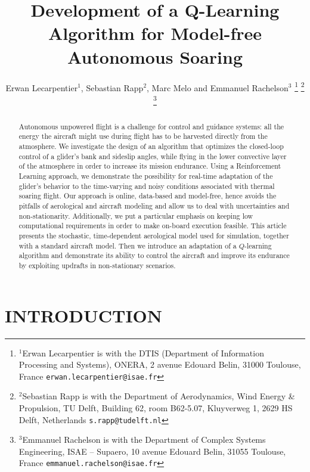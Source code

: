 \documentclass[a4paper, 10pt, conference]{ieeeconf}
\title{\LARGE \bf
	Development of a Q-Learning Algorithm for Model-free Autonomous Soaring
}
\author{Erwan Lecarpentier$^{1}$, Sebastian Rapp$^{2}$, Marc Melo and Emmanuel Rachelson$^{3}$
	\thanks{$^{1}$Erwan Lecarpentier is with the DTIS (Department of Information Processing and Systems), ONERA, 2 avenue Edouard Belin, 31000 Toulouse, France
	{\tt\small erwan.lecarpentier@isae.fr}}
	\thanks{$^{2}$Sebastian  Rapp is with the Department of Aerodynamics, Wind Energy \& Propulsion, TU Delft, Building 62, room B62-5.07, Kluyverweg 1, 2629 HS Delft, Netherlands
	{\tt\small s.rapp@tudelft.nl}}
	\thanks{$^{3}$Emmanuel Rachelson is with the Department of Complex Systems Engineering, ISAE -- Supaero, 10 avenue Edouard Belin, 31055 Toulouse, France
	{\tt\small emmanuel.rachelson@isae.fr}}
}
\begin{document}
\maketitle
\thispagestyle{empty}
\pagestyle{empty}

\begin{abstract}
Autonomous unpowered flight is a challenge for control and guidance systems: all the energy the aircraft might use during flight has to be harvested directly from the atmosphere.
We investigate the design of an algorithm that optimizes the closed-loop control of a glider's bank and sideslip angles, while flying in the lower convective layer of the atmosphere in order to increase its mission endurance.
Using a Reinforcement Learning approach, we demonstrate the possibility for real-time adaptation of the glider's behavior to the time-varying and noisy conditions associated with thermal soaring flight.
{\color{red} Our approach is online, data-based and model-free, hence avoids the pitfalls of aerological and aircraft modeling and allow us to deal with uncertainties and non-stationarity.}
Additionally, we put a particular emphasis on keeping low computational requirements in order to make on-board execution feasible.
This article presents the stochastic, time-dependent aerological model used for simulation, together with a standard aircraft model. Then we introduce an adaptation of a $Q$-learning algorithm and demonstrate its ability to control the aircraft and improve its endurance by exploiting updrafts in non-stationary scenarios.
\end{abstract}


\section{INTRODUCTION}
\end{document}
